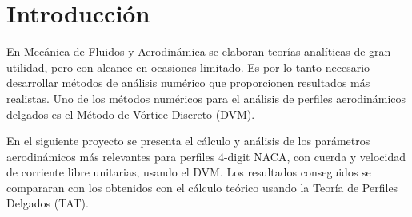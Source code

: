 
\section{Introducción}

En Mecánica de Fluidos y Aerodinámica se elaboran teorías analíticas de gran utilidad, pero con alcance en ocasiones limitado. Es por lo tanto necesario desarrollar métodos de análisis numérico que proporcionen resultados más realistas. Uno de los métodos numéricos para el análisis de perfiles aerodinámicos delgados es el Método de Vórtice Discreto (DVM). 

En el siguiente proyecto se presenta el cálculo y análisis de los parámetros aerodinámicos más relevantes para perfiles 4-digit NACA, con cuerda y velocidad de corriente libre unitarias, usando el DVM. Los resultados conseguidos se compararan con los obtenidos con el cálculo teórico usando la Teoría de Perfiles Delgados (TAT).